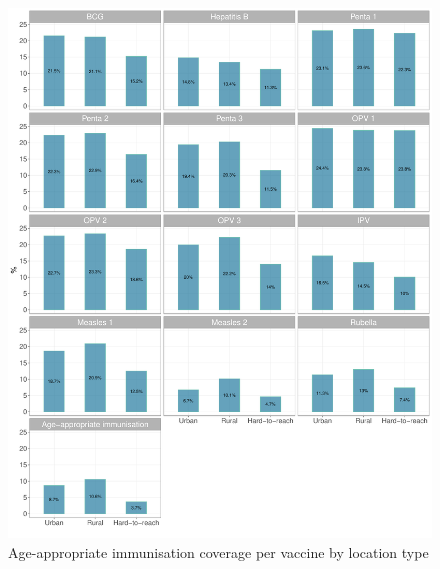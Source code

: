 \documentclass[12pt,a4paper]{article}
\begin{document}
\begin{figure}[H]

{\centering \includegraphics{kayinReport_files/figure-latex/epi3aPlot-1} 

}

\caption{Age-appropriate immunisation coverage per vaccine by location type}\label{fig:epi3aPlot}
\end{figure}
\end{document}
